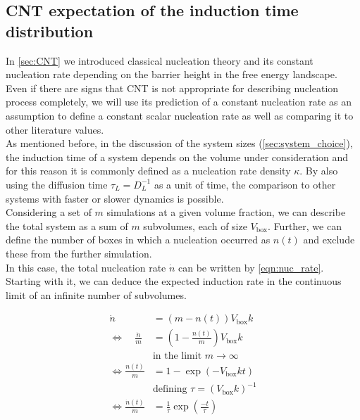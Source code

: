 \subsection{CNT expectation of the induction time distribution}
\label{sec:induction_time_expectation}
In \autoref{sec:CNT} we introduced classical nucleation theory and its constant nucleation rate depending on the barrier height in the free energy landscape. Even if there are signs that CNT is not appropriate for describing nucleation process completely, we will use its prediction of a constant nucleation rate as an assumption to define a constant scalar nucleation rate as well as comparing it to other literature values.\\

As mentioned before, in the discussion of the system sizes (\autoref{sec:system_choice}), the induction time of a system depends on the volume under consideration and for this reason it is commonly defined as a nucleation rate density $\kappa$. By also using the diffusion time $\tau_L = D_L^{-1}$ as a unit of time, the comparison to other systems with faster or slower dynamics is possible.\\

Considering a set of $m$ simulations at a given volume fraction, we can describe the total system as a sum of $m$ subvolumes, each of size $V_{\text{box}}$. Further, we can define the number of boxes in which a nucleation occurred as $n(t)$ and exclude these from the further simulation.\\

In this case, the total nucleation rate $ \dot{n} $ can be written by \autoref{eqn:nuc_rate}. Starting with it, we can deduce the expected induction rate in the continuous limit of an infinite number of subvolumes.

\begin{align}
\label{eqn:nuc_rate}
\dot{n} &= (m - n(t))V_{\text{box}}k\\
\Leftrightarrow \quad \!\frac{\dot{n}}{m} &= \left(1 - \frac{n(t)}{m}\right) V_{\text{box}}k \nonumber\\
 &  \text{in the limit } m \rightarrow \infty \nonumber\\
\Leftrightarrow \frac{n(t)}{m} &= 1 - \exp\left( -V_{\text{box}} k t \right)\\
 &  \text{defining } \tau = (V_{\text{box}} k)^{-1} \nonumber\\
\label{eqn:nuc_rate_result}
\Leftrightarrow \frac{\dot{n}(t)}{m} &= \frac{1}{\tau} \exp\left( \frac{-t}{\tau} \right) 
\end{align}

